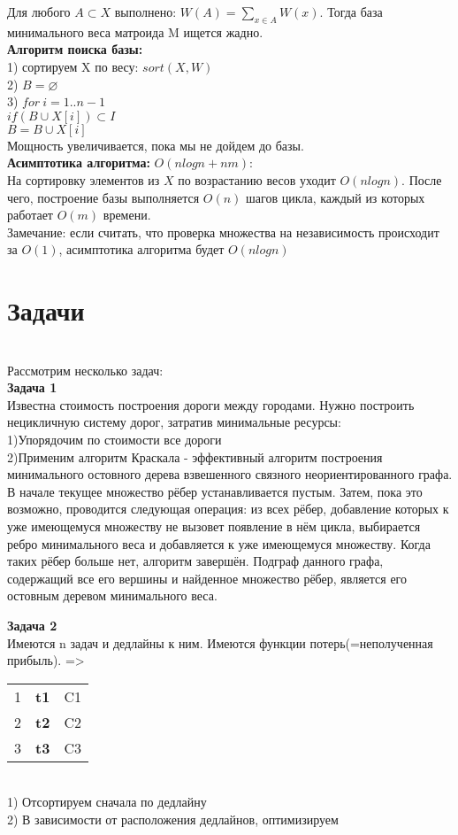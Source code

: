 \documentclass[a4paper,12pt]{article}
\begin{document}
Для любого $A\subset X$ выполнено: $W(A)=\sum\limits_{x\in A} W(x)$. Тогда база минимального веса матроида M ищется жадно.\\

\textbf{Алгоритм поиска базы:}\\
1) сортируем X по весу: $sort (X,W)$\\
 2) $B= \varnothing $\\
 3) $for \: i=1..n-1$\\
 $if (B\cup X[i]) \subset I$\\
 $B=B\cup {X[i]}$\\
 Мощность увеличивается, пока мы не дойдем до базы.\\
 
 \textbf{Асимптотика алгоритма:} $O(nlogn+nm)$:\\
 На сортировку элементов из $X$ по возрастанию весов уходит $O(nlogn)$. После чего, построение базы выполняется $O(n)$ шагов цикла, каждый из которых работает $O(m)$ времени.\\
 Замечание: если считать, что проверка множества на независимость происходит за $O(1)$, асимптотика алгоритма будет $O(nlogn)$
 
 \section {Задачи}
\\Рассмотрим несколько задач: \\

\textbf{Задача 1}\\
Известна стоимость построения дороги между городами. Нужно построить нецикличную систему дорог, затратив минимальные ресурсы:\\
1)Упорядочим по стоимости все дороги\\
2)Применим алгоритм Краскала - эффективный алгоритм построения минимального остовного дерева взвешенного связного неориентированного графа. \\
В начале текущее множество рёбер устанавливается пустым. Затем, пока это возможно, проводится следующая операция: из всех рёбер, добавление которых к уже имеющемуся множеству не вызовет появление в нём цикла, выбирается ребро минимального веса и добавляется к уже имеющемуся множеству. Когда таких рёбер больше нет, алгоритм завершён. Подграф данного графа, содержащий все его вершины и найденное множество рёбер, является его остовным деревом минимального веса.


\textbf{Задача 2}\\
Имеются n задач и дедлайны к ним. Имеются функции потерь(=неполученная прибыль). =>
\begin{tabular}{ccc}
1 & \textbf{t1} & C1 \\
2 & \textbf{t2} & C2 \\
3 & \textbf{t3}& C3 \\
\end{tabular}\\
1) Отсортируем сначала по дедлайну\\
2) В зависимости от расположения дедлайнов, оптимизируем\\
 
 
\end{document}
